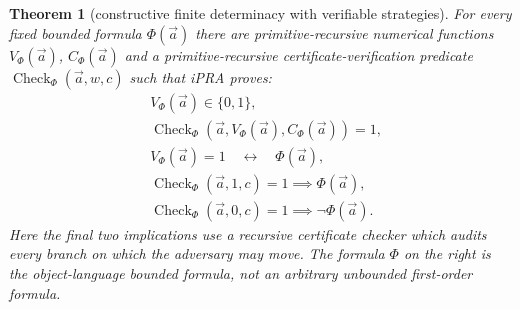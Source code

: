 \documentclass[11pt]{article}
\newtheorem{theorem}{Theorem}[section]
\begin{document}
\begin{theorem}[constructive finite determinacy with verifiable strategies]\label{det}
For every fixed bounded formula $\Phi(\vec a)$ there are primitive-recursive numerical functions $V_\Phi(\vec a)$, $C_\Phi(\vec a)$ and a primitive-recursive certificate-verification predicate $\operatorname{Check}_\Phi(\vec a,w,c)$ such that iPRA proves:
\begin{align*}
& V_\Phi(\vec a)\in\{0,1\},\\
&\operatorname{Check}_\Phi(\vec a,V_\Phi(\vec a),C_\Phi(\vec a))=1,\\
& V_\Phi(\vec a)=1\quad\longleftrightarrow\quad \Phi(\vec a),\\
& \operatorname{Check}_\Phi(\vec a,1,c)=1\implies \Phi(\vec a),\\
& \operatorname{Check}_\Phi(\vec a,0,c)=1\implies \neg\Phi(\vec a).
\end{align*}
Here the final two implications use a \emph{recursive certificate checker} which audits every branch on which the adversary may move. The formula $\Phi$ on the right is the \emph{object-language bounded formula}, not an arbitrary unbounded first-order formula.
\end{theorem}
\end{document}
